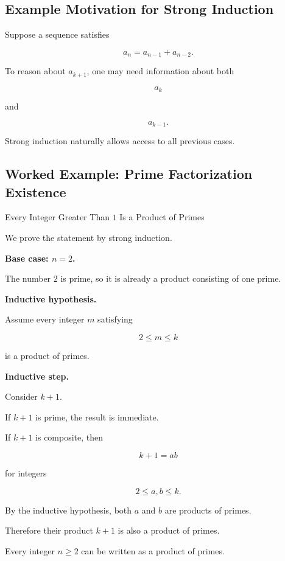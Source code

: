 \subsection{Example Motivation for Strong Induction}
\label{subsec:strong-induction-motivation}

Suppose a sequence satisfies

\[ a_n=a_{n-1}+a_{n-2}. \]

To reason about \(a_{k+1}\), one may need information about both

\[ a_k \]

and

\[ a_{k-1}. \]

Strong induction naturally allows access to all previous cases.

\subsection{Worked Example: Prime Factorization Existence}
\label{subsec:worked-strong-induction}

\begin{workedexamplebox}{Every Integer Greater Than \(1\) Is a Product of Primes}

We prove the statement by strong induction.

\textbf{Base case: \(n=2\).}

The number \(2\) is prime, so it is already a product consisting of one prime.

\textbf{Inductive hypothesis.}

Assume every integer \(m\) satisfying

\[ 2\leq m\leq k \]

is a product of primes.

\textbf{Inductive step.}

Consider \(k+1\).

If \(k+1\) is prime, the result is immediate.

If \(k+1\) is composite, then

\[ k+1=ab \]

for integers

\[ 2\leq a,b\leq k. \]

By the inductive hypothesis, both \(a\) and \(b\) are products of primes.

Therefore their product \(k+1\) is also a product of primes.

\begin{answerbox}
Every integer \(n\geq2\) can be written as a product of primes.
\end{answerbox}
\end{workedexamplebox}

